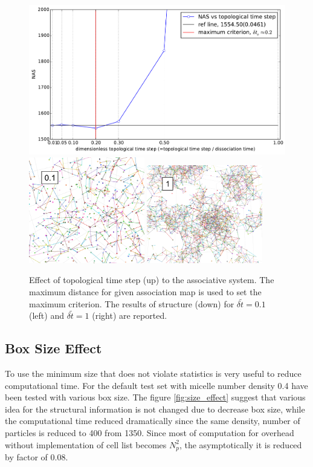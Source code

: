 \documentclass[10pt, a4paper]{article}
\begin{document}
\begin{figure}
  \centering
  \includegraphics[width=\textwidth]{figures/compare_NAS_topological_time_step.pdf}\\
  \includegraphics[width=0.45\textwidth]{figures/sparsely_aggregate.png}
  \includegraphics[width=0.45\textwidth]{figures/densely_aggregate.png}
  \caption{Effect of topological time step (up) to the associative system. The maximum distance for given association map is used to set the maximum criterion. The results of structure (down) for $\delta \tilde{t} = 0.1$ (left) and $\delta \tilde{t} = 1$ (right) are reported.}
  \label{fig:topological_time_step_effect}
\end{figure}

\subsection{Box Size Effect}
To use the minimum size that does not violate statistics is very useful to reduce computational time. For the default test set with micelle number density 0.4 have been tested with various box size. The figure \ref{fig:size_effect} suggest that various idea for the structural information is not changed due to decrease box size, while the computational time reduced dramatically since the same density, number of particles is reduced to 400 from 1350. Since most of computation for overhead without implementation of cell list becomes $N_p^2$, the asymptotically it is reduced by factor of 0.08. 
\end{document}
